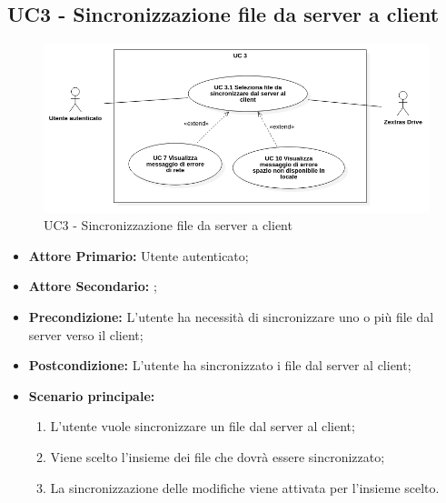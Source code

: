 \subsection{UC3 - Sincronizzazione file da server a client}
\begin{figure}[H]
    \centering
    \includegraphics[scale = 0.6]{components/img/UC3.png}
    \caption{UC3 - Sincronizzazione file da server a client}
\end{figure}
\begin{itemize}
\item \textbf{Attore Primario:} Utente autenticato;
\item \textbf{Attore Secondario:} ;
\item \textbf{Precondizione:} L'utente ha necessità di sincronizzare uno o più file dal server verso il client;
\item \textbf{Postcondizione:} L'utente ha sincronizzato i file dal server al client;
\item \textbf{Scenario principale:}
    \begin{enumerate}
    \item L'utente vuole sincronizzare un file dal server al client;
    \item Viene scelto l'insieme dei file che dovrà essere sincronizzato;
    \item La sincronizzazione delle modifiche viene attivata per l'insieme scelto.
    \end{enumerate}
\end{itemize}
